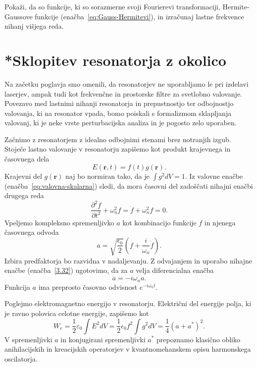 \begin{definition}
Pokaži, da so funkcije, ki so sorazmerne svoji Fourierevi transformaciji, 
Hermite-Gaussove funkcije (enačba~\ref{eq:Gauss-Hermitevi}), 
in izračunaj lastne frekvence nihanj višjega reda.
\end{definition}

\section{*Sklopitev resonatorja z okolico}
Na začetku poglavja smo omenili, da resonatorjev ne uporabljamo le pri 
izdelavi laserjev, ampak tudi kot frekvenčne in
prostorske filtre za svetlobno valovanje. Povezavo med lastnimi nihanji
resonatorja in prepustnostjo ter odbojnostjo valovanja, ki na resonator
vpada, bomo poiskali s formalizmom sklapljanja valovanj, 
ki je neke vrste perturbacijska analiza in je pogosto zelo uporaben.

Začnimo z resonatorjem z idealno odbojnimi stenami brez notranjih izgub. Stoječe
lastno valovanje v resonatorju zapišemo kot produkt krajevnega in časovnega
dela
\begin{equation}
E(\mathbf{r},t)=f(t)g(\mathbf{r}).
\label{3.31}
\end{equation}
Krajevni del $g(\mathbf{r})$ naj bo normiran tako, da je $\int g^{2}dV=1$. Iz valovne
enačbe (enačba~\ref{eq:valovna-skalarna}) sledi, da mora časovni del zadoščati 
nihajni enačbi drugega reda
\begin{equation}
\frac{\partial^2 f}{\partial t^2}+\omega_{n}^{2}f= \ddot{f} + \omega_{n}^{2}f=0.
\label{3.32}
\end{equation}
Vpeljemo kompleksno spremenljivko $a$ kot kombinacijo funkcije $f$ in njenega
časovnega odvoda
\begin{equation}
a=\sqrt{\frac{\epsilon_{0}}{2}}(f+\frac{i}{\omega_{n}}\dot{f}).
\label{3.33}
\end{equation}
Izbira predfaktorja bo razvidna v nadaljevanju. 
Z odvajanjem in uporabo nihajne enačbe (enačba~\ref{3.32}) ugotovimo, da za $a$ velja 
diferencialna enačba 
\begin{equation}
\dot{a}=-i\omega_{n}a.
\label{3.34}
\end{equation}
Funkcija $a$ ima preprosto časovno odvisnost $e^{-i\omega_{n}t}$.\pagebreak

Poglejmo elektromagnetno energijo v resonatorju. Električni
del energije polja, ki je ravno polovica celotne energije, zapišemo kot
\begin{equation}
W_e = \frac{1}{2}\varepsilon_0 \int E^2 dV = \frac{1}{2}\epsilon_{0}f^{2}
\int g^{2}dV = \frac{1}{4} (a+a^{*})^2.
\end{equation}
V spremenljivki $a$ in konjugirani spremenljivki $a^{*}$ prepoznamo 
klasično obliko anihilacijskih in kreacijskih operatorjev v kvantnomehanskem 
opisu harmonskega oscilatorja. 

